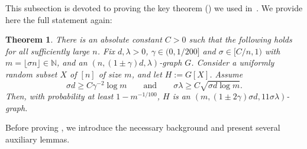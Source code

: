 \documentclass[reqno,a4paper]{amsart}
\newtheorem{theorem}{Theorem}[section]
\theoremstyle{definition}
\begin{document}
This subsection is devoted to proving the key theorem () we used in~. We provide here the full statement again:

\begin{theorem}\label{thm:patched1} 
There is an absolute constant $C>0$ such that the following holds for all sufficiently large $n$.
Fix $d,\lambda>0$, $\gamma\in(0,1/200]$ and $\sigma\in [C/n,1)$ with $m=\lfloor \sigma n\rfloor \in\mathbb N$, and an $(n,(1\pm\gamma)d,\lambda)$-graph $G$. 
Consider a uniformly random subset $X$ of $[n]$ of size $m$, and let $H:=G[X]$. Assume
\begin{equation}\label{eq:patched-hypotheses1}
        \sigma d\ge C\gamma^{-2}\log m
        \qquad \text{and}\qquad
        \sigma\lambda\ge C\sqrt{\sigma d\log m}.
\end{equation}
Then, with probability at least $1-m^{-1/100}$, $H$ is an $(m,(1\pm2\gamma)\sigma d,11\sigma\lambda)$-graph.
\end{theorem}

Before proving , we introduce the necessary background and present several auxiliary lemmas.


\end{document}
